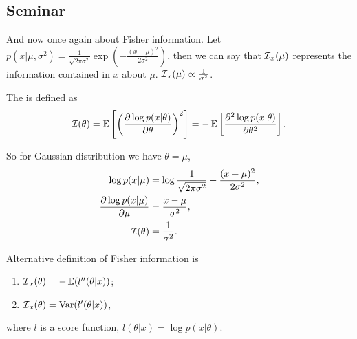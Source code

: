 \subsection{Seminar}

And now once again about Fisher information. Let $p(x | \mu, \sigma^2) = \frac{1}{\sqrt{2\pi \sigma^2}} \exp \left( -\frac{(x - \mu)^2}{2\sigma^2} \right)$, then we can say that $\operatorname{\mathcal{I}}_x(\mu)$ represents the information contained in $x$ about $\mu$. $\operatorname{\mathcal{I}}_x(\mu) \propto \frac{1}{\sigma^2}$.

\begin{edefn}
    The  is defined as $$\operatorname{\mathcal{I}}(\theta) = \operatorname{\mathbb{E}} \left[ \left( \frac{\partial \log p(x | \theta)}{\partial \theta} \right)^2 \right] = -\operatorname{\mathbb{E}} \left[ \frac{\partial^2 \log p(x | \theta)}{\partial \theta^2} \right].$$
\end{edefn}

So for Gaussian distribution we have $\theta = \mu$,
\begin{equation*}
    \begin{aligned}
        \log p(x | \mu) &= \log \frac{1}{\sqrt{2 \pi \sigma^2}}- \frac{(x - \mu)^2}{2\sigma^2}, \\
        \frac{\partial \log p(x | \mu)}{\partial \mu} &= \frac{x - \mu}{\sigma^2}, \\
        \operatorname{\mathcal{I}}(\theta) &= \frac{1}{\sigma^2}.
    \end{aligned}
\end{equation*}

Alternative definition of Fisher information is
\begin{enumerate}
    \item $\operatorname{\mathcal{I}}_x(\theta) = - \operatorname{\mathbb{E}}(l''(\theta | x))$;
    \item $\operatorname{\mathcal{I}}_x(\theta) = \operatorname{Var} (l'(\theta |x))$,
\end{enumerate}

where $l$ is a score function, $l(\theta | x) = \log p(x | \theta)$.
